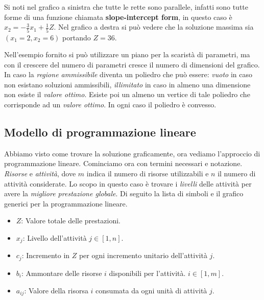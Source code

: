 \documentclass{article}
\begin{document}
Si noti nel grafico a sinistra che tutte le rette sono parallele, infatti sono tutte forme di una funzione chiamata \textbf{slope-intercept form}, in questo caso è $x_2=-\frac{3}{5}x_1+\frac{1}{5}Z$. Nel grafico a destra si può vedere che la soluzione massima sia $(x_1=2,x_2=6)$ portando $Z=36$.

\begin{tcolorbox}[
    colback=lightgray,
    colframe=black,
    coltext=black,
    title=ATTENZIONE,
    colbacktitle=black,
    coltitle=lightgray,
    breakable
  ]
  Nell'esempio fornito si può utilizzare un piano per la scaristà di parametri, ma con il crescere del numero di parametri cresce il numero di dimensioni del grafico. In caso la \textit{regione ammissibile} diventa un poliedro che può essere: \textit{vuoto} in caso non esistano soluzioni ammissibili, \textit{illimitato} in caso in almeno una dimensione non esiste il \textit{valore ottimo}. Esiste poi un almeno un vertice di tale poliedro che corrisponde ad un \textit{valore ottimo}. In ogni caso il poliedro è convesso.

\end{tcolorbox}

\subsection{Modello di programmazione lineare}
Abbiamo visto come trovare la soluzione graficamente, ora vediamo l'approccio di programmazione lineare. Cominciamo ora con termini necessari e notazione. \textit{Risorse} e \textit{attività}, dove $m$ indica il numero di risorse utilizzabili e $n$ il numero di attività considerate. Lo scopo in questo caso è trovare i \textit{livelli} delle attività per avere la \textit{migliore prestazione globale}. Di seguito la lista di simboli e il grafico generici per la programmazione lineare.
\begin{itemize}
  \item $Z$: Valore totale delle prestazioni.
  \item $x_j$: Livello dell'attività $j\in[1,n]$.
  \item $c_j$: Incremento in $Z$ per ogni incremento unitario dell'attività $j$.
  \item $b_i$: Ammontare delle risorse $i$ disponibili per l'attività. $i\in[1,m]$.
  \item $a_{ij}$: Valore della risorsa $i$ consumata da ogni unità di attività $j$.
\end{itemize}
\end{document}
